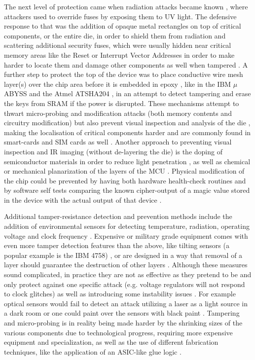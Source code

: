 The next level of protection came when radiation attacks became known \citep{sergei:thesis}, where attackers used to override fuses by exposing them to UV light. The defensive response to that was the addition of opaque metal rectangles on top of critical components, or the entire die, in order to shield them from radiation and scattering additional security fuses, which were usually hidden near critical memory areas like the Reset or Interrupt Vector Addresses in order to make harder to locate them and damage other components as well when tampered \citep{sergei:thesis} \citep{hwre}. A further step to protect the top of the device was to place conductive wire mesh layer(s) over the chip area before it is embedded in epoxy , like in the IBM $\mu$ABYSS \citep{website:ibm_secure} and the Atmel ATSHA204 \citep{hwre}, in an attempt to detect tampering and erase the keys from SRAM if the power is disrupted. These mechanisms attempt to thwart micro-probing and modification attacks (both memory contents and circuitry modification) but also prevent visual inspection and analysis of the die \citep{hwre}, making the localisation of critical components harder and are commonly found in smart-cards \citep{sergei:thesis} and SIM cards as well \citep{hwre}. Another approach to preventing visual inspection and IR imaging (without de-layering the die) is the doping of semiconductor materials in order to reduce light penetration \citep{sergei:thesis}, as well as chemical or mechanical planarization of the layers of the MCU \citep{sergei:thesis} \citep{planarization_techniques}. Physical modification of the chip could be prevented by having both hardware health-check routines and by software self tests comparing the known cipher-output of a magic value stored in the device with the actual output of that device \citep{anderson:tamper_resistance}.

Additional tamper-resistance detection and prevention methods include the addition of environmental sensors for detecting temperature, radiation, operating voltage and clock frequency \citep{sergei:thesis}. Expensive or military grade equipment comes with even more tamper detection features than the above, like tilting sensors (a popular example is the IBM 4758) \citep{website:ibm_secure}, or are designed in a way that removal of a layer should guarantee the destruction of other layers \citep{anderson:cautionary_note}. Although these measures sound complicated, in practice they are not as effective as they pretend to be and only protect against one specific attack (e.g. voltage regulators will not respond to clock glitches) as well as introducing some instability issues \citep{anderson:cautionary_note}. For example optical sensors would fail to detect an attack utilizing a laser as a light source in a dark room \citep{hwre} or one could paint over the sensors with black paint \citep{sergei:thesis}. Tampering and micro-probing is in reality being made harder by the shrinking sizes of the various components due to technological progress, requiring more expensive equipment and specialization, as well as the use of different fabrication techniques, like the application of an ASIC-like glue logic \citep{sergei:thesis} \citep{hwre}.
